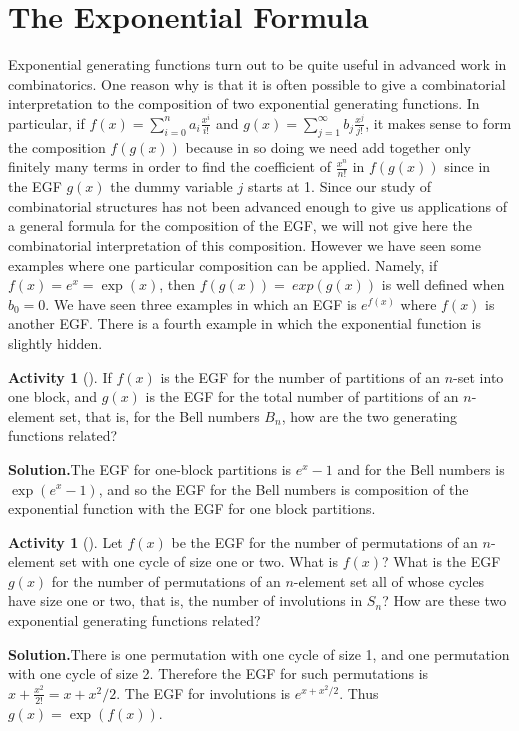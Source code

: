 \documentclass[10pt,]{book}
\theoremstyle{plain}
\theoremstyle{definition}
\newtheorem{activity}[project]{Activity}
\numberwithin{equation}{chapter}
\begin{document}
\section[{The Exponential Formula}]{The Exponential Formula}\label{section-28}
Exponential generating functions turn out to be quite useful in advanced work in combinatorics. One reason why is that it is often possible to give a combinatorial interpretation to the composition of two exponential generating functions. In particular, if \(f(x) =
\sum_{i=0}^n a_i\frac{x^i}{i!}\) and \(g(x) = \sum_{j=1}^\infty b_j \frac{x^j}{j!}\), it makes sense to form the composition \(f(g(x))\) because in so doing we need add together only finitely many terms in order to find the coefficient of \(\frac{x^n}{n!}\) in \(f(g(x))\) since in the EGF \(g(x)\) the dummy variable \(j\) starts at 1. Since our study of combinatorial structures has not been advanced enough to give us applications of a general formula for the composition of the EGF, we will not give here the combinatorial interpretation of this composition. However we have seen some examples where one particular composition can be applied. Namely, if \(f(x) = e^x = \exp(x)\), then \(f(g(x)) =\ exp(g(x))\) is well defined when \(b_0=0\). We have seen three examples in which an EGF is \(e^{f(x)}\) where \(f(x)\) is another EGF. There is a fourth example in which the exponential function is slightly hidden.%
\begin{activity}[]\label{exp_oneblock_}
If \(f(x)\) is the EGF for the number of partitions of an \(n\)-set into one block, and \(g(x)\) is the EGF for the total number of partitions of an \(n\)-element set, that is, for the Bell numbers \(B_n\), how are the two generating functions related?%
\par\medskip\noindent%
\textbf{Solution.}\quad The EGF for one-block partitions is \(e^x-1\) and for the Bell numbers is \(\exp(e^x-1)\), and so the EGF for the Bell numbers is composition of the exponential function with the EGF for one block partitions.%
\end{activity}
\begin{activity}[]\label{exp_oneortwo-cycle_}
Let \(f(x)\) be the EGF for the number of permutations of an \(n\)-element set with one cycle of size one or two. What is \(f(x)\)? What is the EGF \(g(x)\) for the number of permutations of an \(n\)-element set all of whose cycles have size one or two, that is, the number of involutions in \(S_n\)? How are these two exponential generating functions related?%
\par\medskip\noindent%
\textbf{Solution.}\quad There is one permutation with one cycle of size 1, and one permutation with one cycle of size 2. Therefore the EGF for such permutations is \(x+\frac{x^2}{2!}= x+x^2/2\). The EGF for involutions is \(e^{x+x^2/2}\). Thus \(g(x) = \exp(f(x))\).%
\end{activity}
\end{document}
